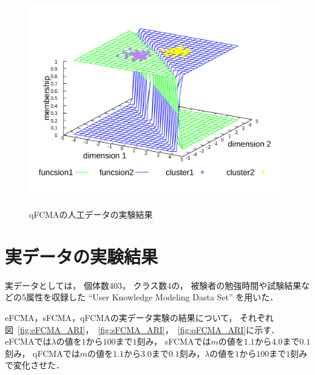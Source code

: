 \documentclass[twocolumn, a4paper]{icethesisabst}
\begin{document}
\begin{figure}[htbp]
\begin{minipage}{0.43\hsize}
  \includegraphics[width=\linewidth]{qFCMA-Em11-Lambda10000.pdf}
  \label{fig:qFCMA-Em11-Lambda10000}
 \end{minipage}
 \caption{qFCMAの人工データの実験結果}
\end{figure}


\section{実データの実験結果}
実データとしては，
個体数403，
クラス数4の，
被験者の勉強時間や試験結果などの5属性を収録した
``User Knowledge Modeling Dasta Set''
を用いた．

eFCMA，sFCMA，qFCMAの実データ実験の結果について，
それぞれ図~\ref{fig:eFCMA_ARI}，~\ref{fig:sFCMA_ARI}，~\ref{fig:qFCMA_ARI}に示す．
eFCMAでは$\lambda$の値を$1$から$100$まで$1$刻み，
sFCMAでは$m$の値を$1.1$から$4.0$まで$0.1$刻み，
qFCMAでは$m$の値を$1.1$から$3.0$まで$0.1$刻み，$\lambda$の値を$1$から$100$まで$1$刻みで変化させた．
\end{document}
